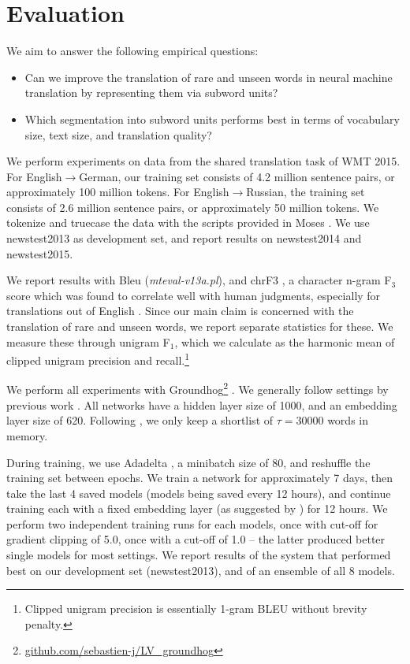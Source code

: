 \section{Evaluation}
\label{sec-eval}

We aim to answer the following empirical questions:

\begin{itemize}

\item Can we improve the translation of rare and unseen words in neural machine translation by representing them via subword units?
\item Which segmentation into subword units performs best in terms of vocabulary size, text size, and translation quality?
\end{itemize}

We perform experiments on data from the shared translation task of WMT 2015. For English$\to$German, our training set consists of 4.2 million sentence pairs, or approximately 100 million tokens. For English$\to$Russian, the training set consists of 2.6 million sentence pairs, or approximately 50 million tokens. We tokenize and truecase the data with the scripts provided in Moses \cite{koehnmoses}. We use newstest2013 as development set, and report results on newstest2014 and newstest2015.

We report results with {\sc Bleu} (\emph{mteval-v13a.pl}),
and {\sc chrF3} \cite{popovic:2015:WMT}, a character n-gram F$_3$ score which was found to correlate well with human judgments, especially for translations out of English \cite{stanojevic-EtAl:2015:WMT}. Since our main claim is concerned with the translation of rare and unseen words, we report separate statistics for these. We measure these through unigram F$_1$, which we calculate as the harmonic mean of clipped unigram precision and recall.\footnote{Clipped unigram precision is essentially 1-gram BLEU without brevity penalty.}

We perform all experiments with Groundhog\footnote{\url{github.com/sebastien-j/LV_groundhog}} \cite{DBLP:journals/corr/BahdanauCB14}. We generally follow settings by previous work \cite{DBLP:journals/corr/BahdanauCB14,jean15}. All networks have a hidden layer size of 1000, and an embedding layer size of 620. Following , we only keep a shortlist of $\tau=30000$ words in memory.

During training, we use Adadelta \cite{DBLP:journals/corr/abs-1212-5701}, a minibatch size of 80, and reshuffle the training set between epochs. We train a network for approximately 7 days, then take the last 4 saved models (models being saved every 12 hours), and continue training each with a fixed embedding layer (as suggested by \cite{jean15}) for 12 hours. We perform two independent training runs for each models, once with cut-off for gradient clipping \cite{DBLP:conf/icml/PascanuMB13} of 5.0, once with a cut-off of 1.0 -- the latter produced better single models for most settings. We report results of the system that performed best on our development set (newstest2013), and of an ensemble of all 8 models.

